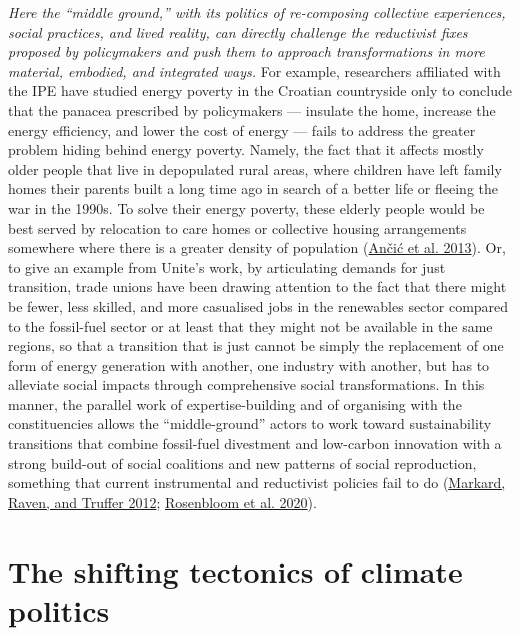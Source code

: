 \documentclass[a4paper, nobind]{templates/ociamthesis}
\begin{document}
\emph{Here the ``middle ground,'' with its politics of re-composing collective experiences, social practices, and lived reality, can directly challenge the reductivist fixes proposed by policymakers and push them to approach transformations in more material, embodied, and integrated ways.} For example, researchers affiliated with the IPE have studied energy poverty in the Croatian countryside only to conclude that the panacea prescribed by policymakers --- insulate the home, increase the energy efficiency, and lower the cost of energy --- fails to address the greater problem hiding behind energy poverty. Namely, the fact that it affects mostly older people that live in depopulated rural areas, where children have left family homes their parents built a long time ago in search of a better life or fleeing the war in the 1990s. To solve their energy poverty, these elderly people would be best served by relocation to care homes or collective housing arrangements somewhere where there is a greater density of population (\protect\hyperlink{ref-ancic_energetsko_2013}{Ančić et al. 2013}). Or, to give an example from Unite's work, by articulating demands for just transition, trade unions have been drawing attention to the fact that there might be fewer, less skilled, and more casualised jobs in the renewables sector compared to the fossil-fuel sector or at least that they might not be available in the same regions, so that a transition that is just cannot be simply the replacement of one form of energy generation with another, one industry with another, but has to alleviate social impacts through comprehensive social transformations. In this manner, the parallel work of expertise-building and of organising with the constituencies allows the ``middle-ground'' actors to work toward sustainability transitions that combine fossil-fuel divestment and low-carbon innovation with a strong build-out of social coalitions and new patterns of social reproduction, something that current instrumental and reductivist policies fail to do (\protect\hyperlink{ref-markard_sustainability_2012}{Markard, Raven, and Truffer 2012}; \protect\hyperlink{ref-rosenbloom_opinion_2020}{Rosenbloom et al. 2020}).

\hypertarget{the-shifting-tectonics-of-climate-politics}{%
\section{The shifting tectonics of climate politics}\label{the-shifting-tectonics-of-climate-politics}}
\end{document}
